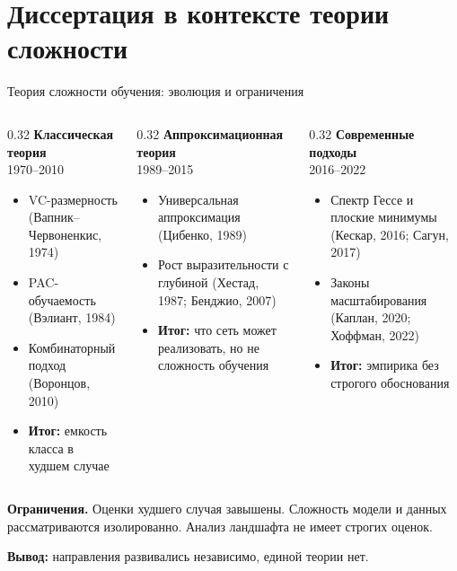 \documentclass[10pt,pdf,hyperref={unicode}]{beamer}
\begin{document}
\section{Диссертация в контексте теории сложности}
\begin{frame}{Теория сложности обучения: эволюция и ограничения}
\justifying
\small
\setlength{\columnsep}{6pt}
\begin{columns}[T,onlytextwidth]
\begin{column}{0.32\textwidth}
\centering
\textbf{Классическая теория}\\[2pt]{\footnotesize 1970--2010}\\[2pt]\setlength{\parskip}{2pt}
\begin{itemize}
    \item VC-размерность (Вапник--Червоненкис, 1974)
    \item PAC-обучаемость (Вэлиант, 1984)
    \item Комбинаторный подход (Воронцов, 2010)
    \item \textbf{Итог:} емкость класса в худшем случае
\end{itemize}
\end{column}
\begin{column}{0.32\textwidth}
\centering
\textbf{Аппроксимационная теория}\\[2pt]{\footnotesize 1989--2015}\\[2pt]\setlength{\parskip}{2pt}
\begin{itemize}
    \item Универсальная аппроксимация (Цибенко, 1989)
    \item Рост выразительности с глубиной (Хестад, 1987; Бенджио, 2007)
    \item \textbf{Итог:} что сеть может реализовать, но не сложность обучения
\end{itemize}
\end{column}
\begin{column}{0.32\textwidth}
\centering
\textbf{Современные подходы}\\[2pt]{\footnotesize 2016--2022}\\[2pt]\setlength{\parskip}{2pt}
\begin{itemize}
    \item Спектр Гессе и плоские минимумы (Кескар, 2016; Сагун, 2017)
    \item Законы масштабирования (Каплан, 2020; Хоффман, 2022)
    \item \textbf{Итог:} эмпирика без строгого обоснования
\end{itemize}
\end{column}
\end{columns}
\vspace{0.2em}
\textbf{Ограничения.} Оценки худшего случая завышены. Сложность модели и данных рассматриваются изолированно. Анализ ландшафта не имеет строгих оценок.

\vspace{0.15em}
\textbf{Вывод:} направления развивались независимо, единой теории нет.
\end{frame}
\end{document}

